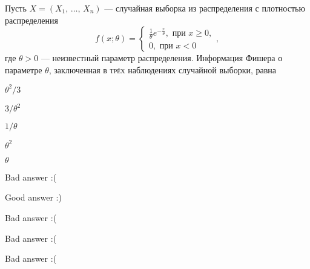 
\begin{question}
Пусть \(X = (X_1, \, \ldots, \, X_n)\) --- случайная выборка из
распределения с плотностью распределения \[
f(x; \theta) =
\begin{cases}
\frac{1}{\theta} e^{-\frac{x}{\theta}}, \text{ при } x \geq 0, \\
0, \text{ при } x < 0
\end{cases},
\] где \(\theta > 0\) --- неизвестный параметр распределения. Информация
Фишера о параметре \(\theta\), заключенная в \textsc{трёх} наблюдениях
случайной выборки, равна
\begin{answerlist}
  \item \(\theta^2 / 3\)
  \item \(3 / \theta^2\)
  \item \(1 / \theta\)
  \item \(\theta^2\)
  \item \(\theta\)
\end{answerlist}
\end{question}

\begin{solution}
\begin{answerlist}
  \item Bad answer :(
  \item Good answer :)
  \item Bad answer :(
  \item Bad answer :(
  \item Bad answer :(
\end{answerlist}
\end{solution}


